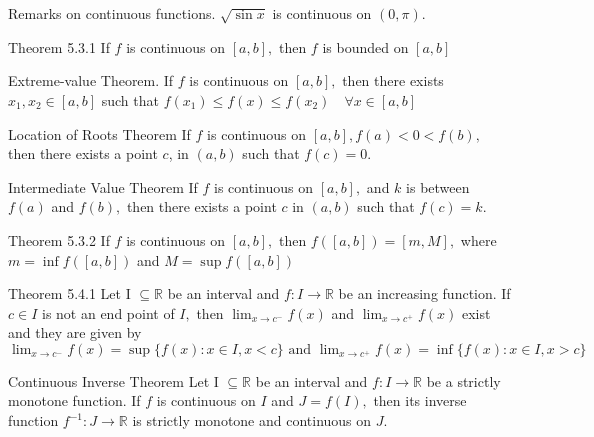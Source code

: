 \documentclass[10pt,landscape]{article}
\theoremstyle{definition}
\newcommand{\thistheoremname}{}
\newtheorem*{genericthm*}{\thistheoremname}
\newenvironment{namedthm*}[1]
{\renewcommand{\thistheoremname}{#1}\begin{genericthm*}}
{\end{genericthm*}}
\begin{document}
\begin{multicols}{3}
	\begin{namedthm*}{Remarks on continuous functions.}
		\(\sqrt{\sin x}\) is continuous on \((0,\pi)\).
	\end{namedthm*}

	\begin{namedthm*}{Theorem 5.3.1}
		If \(f\) is continuous on \([a, b],\) then \(f\) is bounded on \([a, b]\)
	\end{namedthm*}

	\begin{namedthm*}{Extreme-value Theorem.}
		If \(f\) is continuous on \([a, b],\) then there exists \(x_{1}, x_{2} \in[a, b]\) such that
		\(
		f\left(x_{1}\right) \leq f(x) \leq f\left(x_{2}\right) \quad \forall x \in[a, b]
		\)
	\end{namedthm*}

	\begin{namedthm*}{Location of Roots Theorem}
		If \(f\) is continuous on \([a, b], f(a)<0<f(b),\) then there exists a point \(c\),
		in \((a, b)\) such that \(f(c)=0 .\)
	\end{namedthm*}

	\begin{namedthm*}{Intermediate Value Theorem}	If \(f\) is continuous on \([a, b],\) and 	\(k\) is between \(f(a)\) and \(f(b),\) 	then there exists a point \(c\) in \((a,	 b)\) such that \(f(c)=k .\)
	\end{namedthm*}

	\begin{namedthm*}{Theorem 5.3.2}
		If \(f\) is continuous on \([a, b],\) then
		\(
		f([a, b])=[m, M],
		\)
		where \(m=\inf f([a, b])\) and \(M=\sup f([a, b])\)
	\end{namedthm*}

	\begin{namedthm*}{Theorem 5.4.1}
		Let I \(\subseteq \mathbb{R}\) be an interval and \(f: I \rightarrow \mathbb{R}\) be an increasing function. If \(c \in I\) is not an
		end point of \(I,\) then \(\lim _{x \rightarrow c^{-}} f(x)\) and \(\lim _{x \rightarrow c^{+}} f(x)\) exist and they are given by
		\(
		\lim _{x \rightarrow c^{-}} f(x)=\sup \{f(x): x \in I, x<c\} \text { and } \lim _{x \rightarrow c^{+}} f(x)=\inf \{f(x): x \in I, x>c\}
		\)
	\end{namedthm*}

	\begin{namedthm*}{Continuous Inverse Theorem}
		Let I \(\subseteq \mathbb{R}\) be an interval and \(f: I \rightarrow \mathbb{R}\) be a strictly monotone
		function. If \(f\) is continuous on \(I\) and \(J=f(I),\) then its inverse function \(f^{-1}: J \rightarrow \mathbb{R}\) is strictly
		monotone and continuous on \(J .\)
	\end{namedthm*}


\end{multicols}
\end{document}
